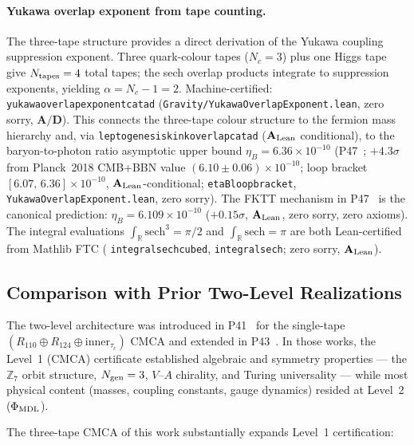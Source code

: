 \documentclass[11pt]{article}
\theoremstyle{remark}
\newcommand{\lean}[1]{%
  \penalty-100
  \begingroup\def\_{\textunderscore\allowbreak}\texttt{#1}\endgroup}
\newcommand{\CatAL}{\ensuremath{\textbf{A}_{\rm Lean}}}
\newcommand{\CatAD}{\textbf{A/D}}
\begin{document}
\paragraph{Yukawa overlap exponent from tape counting.}
The three-tape structure provides a direct derivation of the Yukawa coupling suppression
exponent. Three quark-colour tapes ($N_c = 3$) plus one Higgs tape give $N_{\rm tapes} = 4$
total tapes; the sech overlap products integrate to suppression exponents, yielding
$\alpha = N_c - 1 = 2$.  Machine-certified: \lean{yukawa\_overlap\_exponent\_catad}
(\texttt{Gravity/YukawaOverlapExponent.lean}, zero sorry, $\CatAD$).  This connects
the three-tape colour structure to the fermion mass hierarchy and, via
\lean{leptogenesis\_kink\_overlap\_catad} ($\CatAL$ conditional), to the baryon-to-photon ratio
asymptotic upper bound $\eta_B = 6.36\times10^{-10}$ (P47~\cite{SpivackGTECosmology}; $+4.3\sigma$ from
Planck~2018 CMB+BBN value $(6.10\pm0.06)\times10^{-10}$;
loop bracket $[6.07,\,6.36]\times10^{-10}$, $\CatAL$-conditional;
\lean{eta\_B\_loop\_bracket}, \texttt{YukawaOverlapExponent.lean}, zero sorry).
The FKTT mechanism in P47~\cite{SpivackGTECosmology} is the canonical prediction:
$\eta_B = 6.109\times10^{-10}$ ($+0.15\sigma$, $\CatAL$, zero sorry, zero axioms).
The integral evaluations $\int_{\mathbb{R}}\mathrm{sech}^3 = \pi/2$ and
$\int_{\mathbb{R}}\mathrm{sech} = \pi$ are both Lean-certified from Mathlib FTC
(\lean{integral\_sech\_cubed}, \lean{integral\_sech}; zero sorry, $\CatAL$).

\subsection{Comparison with Prior Two-Level Realizations}
\label{sec:twolevel-comparison}

The two-level architecture was introduced in P41~\cite{SpivackCMCA} for the single-tape
$(R_{110} \oplus R_{124} \oplus \text{inner}_{\tau_c})$ CMCA and extended in P43~\cite{SpivackCompleteness}.
In those works, the Level~1 (CMCA) certificate established algebraic and symmetry properties ---
the $\mathbb{Z}_7$ orbit structure, $N_{\rm gen}=3$, $V$--$A$ chirality, and Turing universality ---
while most physical content (masses, coupling constants, gauge dynamics) resided at Level~2
($\Phi_{\rm MDL}$).

The three-tape CMCA of this work substantially expands Level~1 certification:
\end{document}
